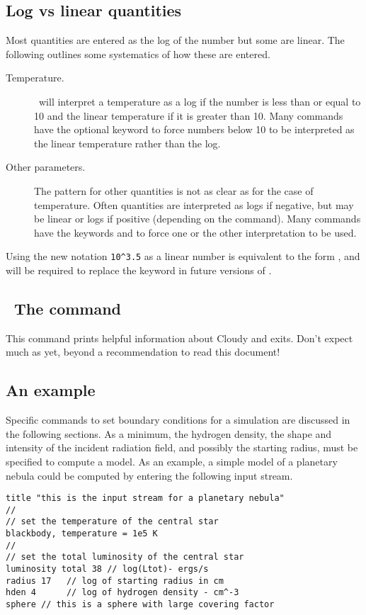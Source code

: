 \subsection{Log vs linear quantities}

Most
quantities are entered as the log of the number but some are linear.
The
following outlines some systematics of how these are entered.
\begin{description}
\item[Temperature.]  \Cloudy\ will interpret a temperature as a log if the number
is less than or equal to 10 and the linear temperature if it is greater
than 10.  Many commands have the optional keyword  to force numbers
below 10 to be interpreted as the linear temperature rather than the log.

\item[Other parameters.]  The pattern for other quantities is not as clear as
for the case of temperature.  Often quantities are interpreted as logs if
negative, but may be linear or logs if positive (depending on the command).
Many commands have the keywords  and  to force one or the other
interpretation to be used.

\end{description}

Using the new notation \verb|10^3.5| as a linear number is equivalent
to the form , and will be required to replace the
 keyword in future versions of \Cloudy.

\begin{shaded}
\subsection{\experimental\ The  command}

This command prints helpful information about Cloudy and exits.  Don't
expect much as yet, beyond a recommendation to read this document!

\end{shaded}

\subsection{An example}

Specific commands to set boundary conditions for a simulation are
discussed in the following sections.
As a minimum, the hydrogen density,
the shape and intensity of the incident radiation field,
and possibly the starting radius, must be specified to compute a model.
As an example, a simple model
of a planetary nebula could be computed by entering
the following input stream.
\begin{verbatim}
title "this is the input stream for a planetary nebula"
//
// set the temperature of the central star
blackbody, temperature = 1e5 K
//
// set the total luminosity of the central star
luminosity total 38 // log(Ltot)- ergs/s
radius 17   // log of starting radius in cm
hden 4      // log of hydrogen density - cm^-3
sphere // this is a sphere with large covering factor
\end{verbatim}

